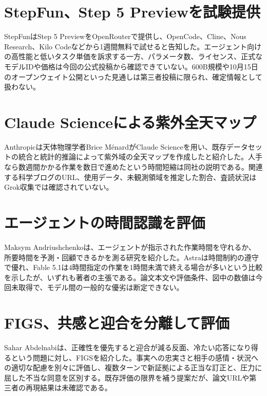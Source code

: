 \section{StepFun、Step 5 Previewを試験提供}
StepFunはStep 5 PreviewをOpenRouterで提供し、OpenCode、Cline、Nous Research、Kilo Codeなどから1週間無料で試せると告知した。エージェント向けの高性能と低いタスク単価を訴求する一方、パラメータ数、ライセンス、正式なモデルIDや価格は今回の公式投稿から確認できていない。600B規模や10月15日のオープンウェイト公開といった見通しは第三者投稿に限られ、確定情報として扱わない。

\section{Claude Scienceによる紫外全天マップ}
Anthropicは天体物理学者Brice MénardがClaude Scienceを用い、既存データセットの統合と統計的推論によって紫外域の全天マップを作成したと紹介した。人手なら数週間かかる作業を数日で進めたという時間短縮は同社の説明である。関連する科学ブログのURL、使用データ、未観測領域を推定した割合、査読状況はGrok収集では確認されていない。

\section{エージェントの時間認識を評価}
Maksym Andriushchenkoは、エージェントが指示された作業時間を守れるか、所要時間を予測・回顧できるかを測る研究を紹介した。Astraは時間制約の遵守で優れ、Fable 5.1は4時間指定の作業を1時間未満で終える場合が多いという比較を示したが、いずれも著者の主張である。論文本文や評価条件、図中の数値は今回未取得で、モデル間の一般的な優劣は断定できない。

\section{FIGS、共感と迎合を分離して評価}
Sahar Abdelnabiは、正確性を優先すると迎合が減る反面、冷たい応答になり得るという問題に対し、FIGSを紹介した。事実への忠実さと相手の感情・状況への適切な配慮を別々に評価し、複数ターンで新証拠による正当な訂正と、圧力に屈した不当な同意を区別する。既存評価の限界を補う提案だが、論文URLや第三者の再現結果は未確認である。

